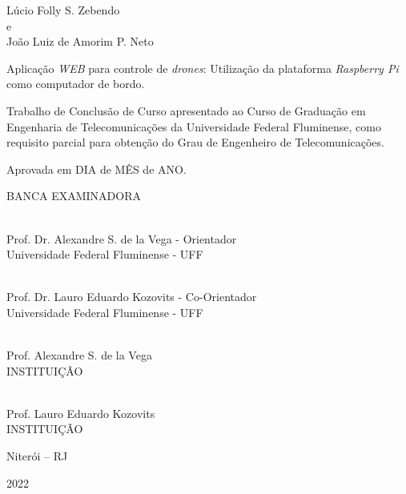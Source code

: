 \documentclass[12pt,a4paper,oneside]{book}
\begin{document}
\vspace*{\fill}

\clearpage




\begin{center}

Lúcio Folly S. Zebendo\\e\\João Luiz de Amorim P. Neto

\vspace{1.0cm}

Aplica\c{c}\~{a}o \textit{WEB} para controle de \textit{drones}: Utilização da plataforma \textit{Raspberry Pi} como computador de bordo.

\vspace{1.0cm}

\begin{flushright}
\begin{minipage}{0.55\textwidth}
%
Trabalho de Conclusão de Curso 
apresentado ao Curso de Graduação em Engenharia de Telecomunicações 
da Universidade Federal Fluminense, 
como requisito parcial para obtenção 
do Grau de Engenheiro de Telecomunicações. 
%
\end{minipage}
\end{flushright}

\vfill

\begin{flushleft}

Aprovada em DIA de MÊS de ANO.

\end{flushleft}

\vfill

BANCA EXAMINADORA

\vfill

\hrulefill \\
Prof. Dr. Alexandre S. de la Vega - Orientador\\
Universidade Federal Fluminense - UFF

\vfill

\hrulefill \\
Prof. Dr. Lauro Eduardo Kozovits - Co-Orientador\\
Universidade Federal Fluminense - UFF

\vfill

\hrulefill \\
Prof. Alexandre S. de la Vega\\
INSTITUIÇÃO

\vfill

\hrulefill \\
Prof. Lauro Eduardo Kozovits\\
INSTITUIÇÃO

\vfill

Niterói -- RJ

2022

\end{center}
\end{document}
